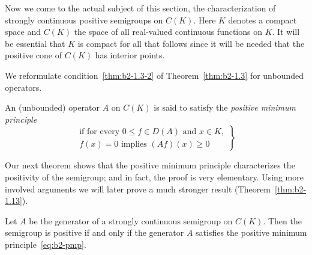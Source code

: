 Now we come to the actual subject of this section, the characterization of strongly continuous positive semigroups on $C(K)$.
Here $K$ denotes a compact space and $C(K)$ the space of all real-valued continuous functions on $K$.
It will be essential that $K$ is compact for all that follows since it will be needed that the positive cone of\/ $C(K)$ has interior points.

We reformulate condition~\ref{thm:b2-1.3-2} of Theorem~\ref{thm:b2-1.3} for unbounded operators.
\begin{definition}\label{def:b2-1.5}
An (unbounded) operator $A$ on $C(K)$ is said to satisfy the \emph{positive minimum principle}  
\begin{equation*}\label{eq:b2-pmp} \tag{P}
\left.
\begin{aligned}
    \text{if for every } 0 \leq f \in D(A) \text{ and } x \in K,\\
    f(x) = 0 \text{ implies } (Af)(x) \geq 0
\end{aligned} 
\right\}   
\end{equation*}
\end{definition}
Our next theorem shows that the positive minimum principle characterizes the positivity of the semigroup; and in fact, the proof is very elementary.
Using more involved arguments we will later prove a much stronger result (Theorem~\ref{thm:b2-1.13}).
\begin{theorem}\label{thm:b2-1.6}
Let $A$ be the generator of a strongly continuous semigroup on $C(K)$.
Then the semigroup is positive if and only if the generator $A$ satisfies the positive minimum principle~\eqref{eq:b2-pmp}.
\end{theorem}
